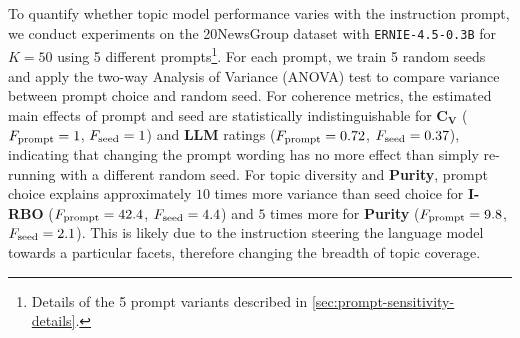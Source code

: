 \documentclass{article}
\theoremstyle{plain}
\theoremstyle{definition}
\theoremstyle{remark}
\begin{document}
To quantify whether topic model performance varies with the instruction prompt, we conduct experiments on the 20NewsGroup dataset with \texttt{ERNIE-4.5-0.3B} for $K=50$ using 5 different prompts\footnote{Details of the 5 prompt variants described in \autoref{sec:prompt-sensitivity-details}.}. For each prompt, we train 5 random seeds and apply the two-way Analysis of Variance (ANOVA) test \citep{scheffe1999analysis} to compare variance between prompt choice and random seed. For coherence metrics, the estimated main effects of prompt and seed are statistically indistinguishable for $\mathbf{C_V}$ ($F_{\rm{prompt}}=1$, $F_{\rm{seed}}=1$) and \textbf{LLM} ratings ($F_{\rm{prompt}}=0.72$, $F_{\rm{seed}}=0.37$),  indicating that changing the prompt wording has no more effect than simply re-running with a different random seed. For topic diversity and \textbf{Purity}, prompt choice explains approximately $10$ times more variance than seed choice for \textbf{I-RBO} ($F_{\rm{prompt}}=42.4$, $F_{\rm{seed}}=4.4$) and $5$ times more for \textbf{Purity} ($F_{\rm{prompt}}=9.8$, $F_{\rm{seed}}=2.1$). This is likely due to the instruction steering the language model towards a particular facets, therefore changing the breadth of topic coverage.



\end{document}
